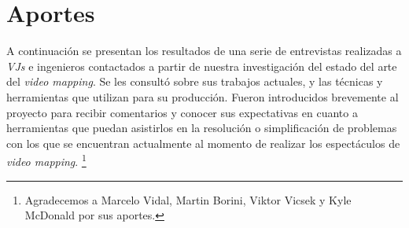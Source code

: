 ﻿\chapter{Aportes}
A continuación se presentan los resultados de una serie de entrevistas realizadas a \emph{VJs} e ingenieros contactados a partir de nuestra investigación del estado del arte del \emph{video mapping}. Se les consultó sobre sus trabajos actuales, y las técnicas y herramientas que utilizan para su producción.
Fueron introducidos brevemente al proyecto para recibir comentarios y conocer sus expectativas en cuanto a herramientas que puedan asistirlos en la resolución o simplificación de problemas con los que se encuentran actualmente al momento de realizar los espectáculos de \emph{video mapping}.
\footnote{Agradecemos a Marcelo Vidal, Martin Borini, Viktor Vicsek y Kyle McDonald por sus aportes.}

